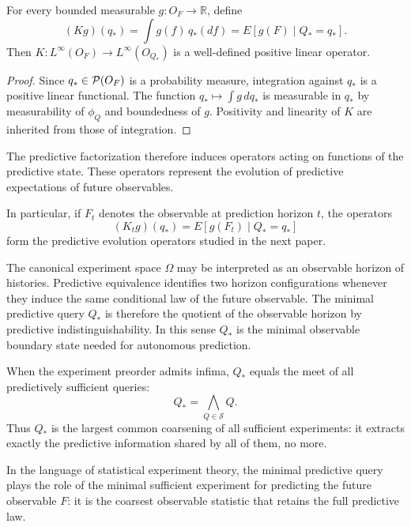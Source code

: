 \begin{corollary}\label{cor:canonical-operator}
For every bounded measurable $g:O_F\to\mathbb R$, define
\[
(K g)(q_*)
=
\int g(f)\,q_*(df)
=
E[g(F)\mid Q_*=q_*].
\]
Then $K:L^\infty(O_F)\to L^\infty(O_{Q_*})$ is a well-defined positive
linear operator.
\end{corollary}

\begin{proof}
Since $q_*\in\mathcal{P}(O_F)$ is a probability measure, integration against
$q_*$ is a positive linear functional.  The function $q_*\mapsto\int g\,dq_*$
is measurable in $q_*$ by measurability of $\phi_Q$ and boundedness
of $g$.  Positivity and linearity of $K$ are inherited from those of
integration.
\end{proof}

\begin{remark}
The predictive factorization therefore induces operators acting on
functions of the predictive state.  These operators represent the
evolution of predictive expectations of future observables.

In particular, if $F_t$ denotes the observable at prediction horizon
$t$, the operators
\[
(K_t g)(q_*)=E[g(F_t)\mid Q_*=q_*]
\]
form the predictive evolution operators studied in the next paper.
\end{remark}

\begin{remark}
The canonical experiment space $\Omega$ may be interpreted as an
observable horizon of histories.  Predictive equivalence identifies
two horizon configurations whenever they induce the same conditional
law of the future observable.  The minimal predictive query $Q_*$ is
therefore the quotient of the observable horizon by predictive
indistinguishability.  In this sense $Q_*$ is the minimal observable
boundary state needed for autonomous prediction.
\end{remark}

\begin{remark}
When the experiment preorder admits infima, $Q_*$ equals the meet of
all predictively sufficient queries:
\[
Q_* = \bigwedge_{Q\in\mathcal S} Q.
\]
Thus $Q_*$ is the largest common coarsening of all sufficient
experiments: it extracts exactly the predictive information shared by
all of them, no more.
\end{remark}

\begin{remark}
In the language of statistical experiment theory, the minimal predictive
query plays the role of the minimal sufficient experiment for predicting
the future observable $F$: it is the coarsest observable statistic that
retains the full predictive law.
\end{remark}

